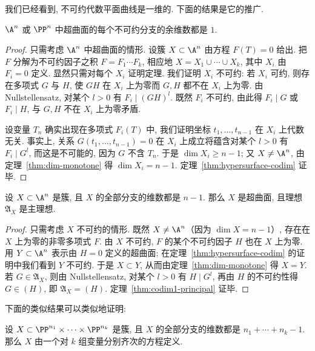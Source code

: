 我们已经看到, 不可约代数平面曲线是一维的. 下面的结果是它的推广.

\begin{theorem}\label{thm:hypersurface-codim}
	$\A^n$ 或 $\PP^n$ 中超曲面的每个不可约分支的余维数都是 $1$.
\end{theorem}

\begin{proof}
	只需考虑 $\A^n$ 中超曲面的情形. 设簇 $X \subset \A^n$ 由方程 $F(T) = 0$ 给出. 把 $F$ 分解为不可约因子之积 $F = F_1 \cdots F_k$, 相应地 $X = X_1 \cup \cdots \cup X_k$, 其中 $X_i$ 由 $F_i = 0$ 定义. 显然只需对每个 $X_i$ 证明定理. 我们证明 $X_i$ 不可约: 若 $X_i$ 可约, 则存在多项式 $G$ 与 $H$, 使 $GH$ 在 $X_i$ 上为零而 $G, H$ 都不在 $X_i$ 上为零. 由 Nullstellensatz, 对某个 $l > 0$ 有 $F_i \mid (GH)^l$. 既然 $F_i$ 不可约, 由此得 $F_i \mid G$ 或 $F_i \mid H$, 与 $G, H$ 不在 $X_i$ 上为零矛盾.

	设变量 $T_n$ 确实出现在多项式 $F_i(T)$ 中, 我们证明坐标 $t_1, \ldots, t_{n-1}$ 在 $X_i$ 上代数无关. 事实上, 关系 $G(t_1, \ldots, t_{n-1}) = 0$ 在 $X_i$ 上成立将蕴含对某个 $l > 0$ 有 $F_i \mid G^l$, 而这是不可能的, 因为 $G$ 不含 $T_n$. 于是 $\dim X_i \ge n-1$; 又 $X \ne \A^n$, 由定理~\ref{thm:dim-monotone} 得 $\dim X_i = n-1$. 定理~\ref{thm:hypersurface-codim} 证毕.
\end{proof}

\begin{theorem}\label{thm:codim1-principal}
	设 $X \subset \A^n$ 是簇, 且 $X$ 的全部分支的维数都是 $n-1$. 那么 $X$ 是超曲面, 且理想 $\mathfrak A_X$ 是主理想.
\end{theorem}

\begin{proof}
	只需考虑 $X$ 不可约的情形. 既然 $X \ne \A^n$（因为 $\dim X = n-1$）, 存在在 $X$ 上为零的非零多项式 $F$. 由 $X$ 不可约, $F$ 的某个不可约因子 $H$ 也在 $X$ 上为零. 用 $Y \subset \A^n$ 表示由 $H = 0$ 定义的超曲面; 在定理~\ref{thm:hypersurface-codim} 的证明中我们看到 $Y$ 不可约. 于是 $X \subset Y$, 从而由定理~\ref{thm:dim-monotone} 得 $X = Y$. 若 $G \in \mathfrak A_X$, 则由 Nullstellensatz, 对某个 $l > 0$ 有 $H \mid G^l$, 再由 $H$ 的不可约性得 $G \in (H)$, 即 $\mathfrak A_X = (H)$. 定理~\ref{thm:codim1-principal} 证毕.
\end{proof}

下面的类似结果可以类似地证明:

\begin{theorem}\label{thm:codim1-principal-multi}
	设 $X \subset \PP^{n_1} \times \cdots \times \PP^{n_k}$ 是簇, 且 $X$ 的全部分支的维数都是 $n_1 + \cdots + n_k - 1$. 那么 $X$ 由一个对 $k$ 组变量分别齐次的方程定义.
\end{theorem}

